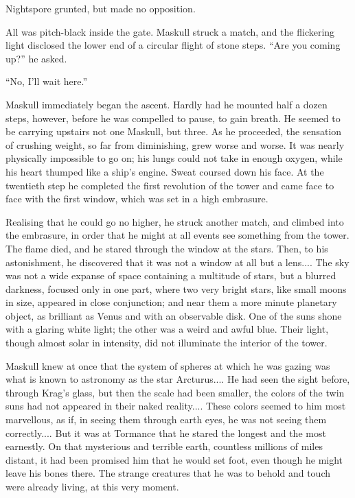 Nightspore grunted, but made no opposition.

All was pitch-black inside the gate. Maskull struck a match, and the flickering light disclosed the lower end of a circular flight of stone steps. ``Are you coming up?'' he asked.

``No, I'll wait here.''

Maskull immediately began the ascent. Hardly had he mounted half a dozen steps, however, before he was compelled to pause, to gain breath. He seemed to be carrying upstairs not one Maskull, but three. As he proceeded, the sensation of crushing weight, so far from diminishing, grew worse and worse. It was nearly physically impossible to go on; his lungs could not take in enough oxygen, while his heart thumped like a ship's engine. Sweat coursed down his face. At the twentieth step he completed the first revolution of the tower and came face to face with the first window, which was set in a high embrasure.

Realising that he could go no higher, he struck another match, and climbed into the embrasure, in order that he might at all events see something from the tower. The flame died, and he stared through the window at the stars. Then, to his astonishment, he discovered that it was not a window at all but a lens.... The sky was not a wide expanse of space containing a multitude of stars, but a blurred darkness, focused only in one part, where two very bright stars, like small moons in size, appeared in close conjunction; and near them a more minute planetary object, as brilliant as Venus and with an observable disk. One of the suns shone with a glaring white light; the other was a weird and awful blue. Their light, though almost solar in intensity, did not illuminate the interior of the tower.

Maskull knew at once that the system of spheres at which he was gazing was what is known to astronomy as the star Arcturus.... He had seen the sight before, through Krag's glass, but then the scale had been smaller, the colors of the twin suns had not appeared in their naked reality.... These colors seemed to him most marvellous, as if, in seeing them through earth eyes, he was not seeing them correctly.... But it was at Tormance that he stared the longest and the most earnestly. On that mysterious and terrible earth, countless millions of miles distant, it had been promised him that he would set foot, even though he might leave his bones there. The strange creatures that he was to behold and touch were already living, at this very moment.


